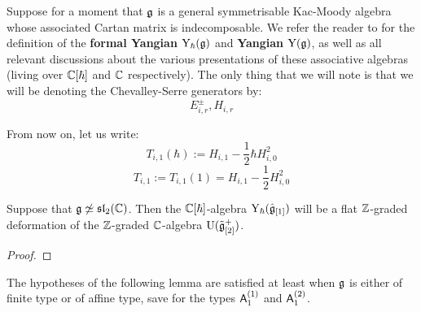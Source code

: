         \begin{convention}
            Suppose for a moment that $\mathfrak{g}$ is a general symmetrisable Kac-Moody algebra whose associated Cartan matrix is indecomposable. We refer the reader to \cite[Section 2]{guay_nakajima_wendlandt_affine_yangian_coproduct} for the definition of the \textbf{formal Yangian} $\mathrm{Y}_{\hbar}(\mathfrak{g})$ and \textbf{Yangian} $\mathrm{Y}(\mathfrak{g})$, as well as all relevant discussions about the various  presentations of these associative algebras (living over $\mathbb{C}[\hbar]$ and $\mathbb{C}$ respectively). The only thing that we will note is that we will be denoting the Chevalley-Serre generators by:
                $$E_{i, r}^{\pm}, H_{i, r}$$
        \end{convention}
        \begin{convention}
            From now on, let us write:
                $$T_{i, 1}(\hbar) := H_{i, 1} - \frac12 \hbar H_{i, 0}^2$$
                $$T_{i, 1} := T_{i, 1}(1) = H_{i, 1} - \frac12 H_{i, 0}^2$$
        \end{convention}
         \begin{lemma} \label{lemma: affine_formal_yangians_as_flat_graded_deformations}
            Suppose that $\mathfrak{g} \not \simeq \mathfrak{sl}_2(\mathbb{C})$. Then the $\mathbb{C}[\hbar]$-algebra $\mathrm{Y}_{\hbar}(\hat{\mathfrak{g}}_{[1]})$ will be a flat $\mathbb{Z}$-graded deformation of the $\mathbb{Z}$-graded $\mathbb{C}$-algebra $\mathrm{U}(\tilde{\mathfrak{g}}_{[2]}^+)$. 
         \end{lemma}
            \begin{proof}
            \end{proof}
        The hypotheses of the following lemma are satisfied at least when $\mathfrak{g}$ is either of finite type or of affine type, save for the types $\mathsf{A}_1^{(1)}$ and $\mathsf{A}_1^{(2)}$.
